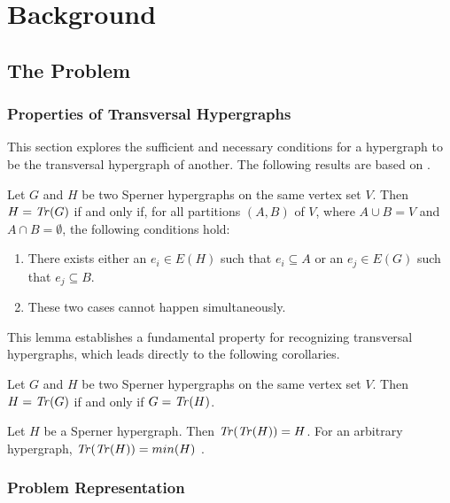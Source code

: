 \chapter{Background}

\section{The \TransHyp{} Problem}

\subsection{Properties of Transversal Hypergraphs}

This section explores the sufficient and necessary conditions for a hypergraph to be the transversal hypergraph of another. The following results are based on \cite{Ber87}.

\begin{lemma}\label{lem:partition}
Let $G$ and $H$ be two Sperner hypergraphs on the same vertex set $V$. Then $H=\mathit{Tr}(G)$ if and only if, for all partitions $(A,B)$ of $V$, where $A\cup B=V$ and $A\cap B=\emptyset$, the following conditions hold:
\begin{enumerate}
\item There exists either an $e_i\in E(H)$ such that $e_i\subseteq A$ or an $e_j\in E(G)$ such that $e_j\subseteq B$.
\item These two cases cannot happen simultaneously.
\end{enumerate}
\end{lemma}

This lemma establishes a fundamental property for recognizing transversal hypergraphs, which leads directly to the following corollaries.

\begin{corollary}
Let $G$ and $H$ be two Sperner hypergraphs on the same vertex set $V$. Then $H=\mathit{Tr}(G)$ if and only if $G=\mathit{Tr}(H)$.
\end{corollary}

\begin{corollary}
Let $H$ be a Sperner hypergraph. Then $\mathit{Tr}(\mathit{Tr}(H))=H$. For an arbitrary hypergraph, $\mathit{Tr}(\mathit{Tr}(H))=min(H)$ .
\end{corollary}

\subsection{Problem Representation}

